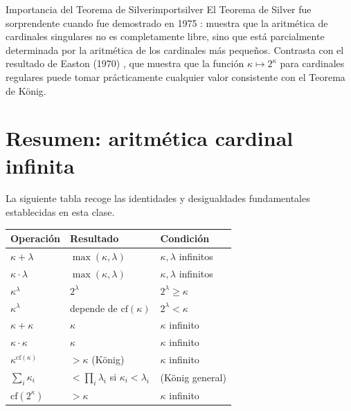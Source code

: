 \begin{observacion}{Importancia del Teorema de Silver}{importsilver}
El Teorema de Silver fue sorprendente cuando fue demostrado en 1975 \cite{silver1975}: muestra que la aritmética de cardinales singulares no es completamente libre, sino que está parcialmente determinada por la aritmética de los cardinales más pequeños. Contrasta con el resultado de Easton (1970) \cite{easton1970}, que muestra que la función $\kappa \mapsto 2^\kappa$ para cardinales regulares puede tomar prácticamente cualquier valor consistente con el Teorema de König.
\end{observacion}

\section{Resumen: aritmética cardinal infinita}

La siguiente tabla recoge las identidades y desigualdades fundamentales establecidas en esta clase.

\begin{center}
\begin{tabular}{lll}
\textbf{Operación} & \textbf{Resultado} & \textbf{Condición} \\
\hline
$\kappa + \lambda$ & $\max(\kappa, \lambda)$ & $\kappa, \lambda$ infinitos \\
$\kappa \cdot \lambda$ & $\max(\kappa, \lambda)$ & $\kappa, \lambda$ infinitos \\
$\kappa^\lambda$ & $2^\lambda$ & $2^\lambda \geq \kappa$ \\
$\kappa^\lambda$ & depende de $\mathrm{cf}(\kappa)$ & $2^\lambda < \kappa$ \\
$\kappa + \kappa$ & $\kappa$ & $\kappa$ infinito \\
$\kappa \cdot \kappa$ & $\kappa$ & $\kappa$ infinito \\
$\kappa^{\mathrm{cf}(\kappa)}$ & $> \kappa$ (König) & $\kappa$ infinito \\
$\sum_i \kappa_i$ & $< \prod_i \lambda_i$ si $\kappa_i < \lambda_i$ & (König general) \\
$\mathrm{cf}(2^\kappa)$ & $> \kappa$ & $\kappa$ infinito \\
\hline
\end{tabular}
\end{center}

\bigskip

